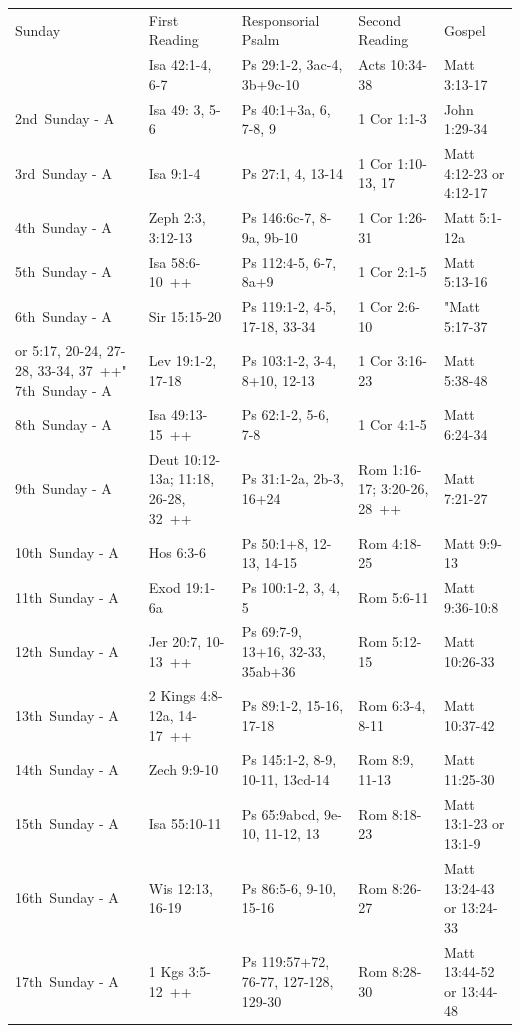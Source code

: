 \documentclass{book}
\begin{document}
\begin{tabular}{l l l l l}
Sunday   &  First Reading  &  Responsorial Psalm  &  Second Reading  &  Gospel\\
[1st Sunday: Baptism of the Lord - A]  &  Isa 42:1-4, 6-7  &  Ps 29:1-2, 3ac-4, 3b+9c-10  &  Acts 10:34-38  &  Matt 3:13-17\\
2nd Sunday - A  &  Isa 49: 3, 5-6  &  Ps 40:1+3a, 6, 7-8, 9  &  1 Cor 1:1-3  &  John 1:29-34\\
3rd Sunday - A  &  Isa 9:1-4  &  Ps 27:1, 4, 13-14  &  1 Cor 1:10-13, 17  &  Matt 4:12-23 or 4:12-17\\
4th Sunday - A  &  Zeph 2:3, 3:12-13  &  Ps 146:6c-7, 8-9a, 9b-10  &  1 Cor 1:26-31  &  Matt 5:1-12a\\
5th Sunday - A  &  Isa 58:6-10 ++  &  Ps 112:4-5, 6-7, 8a+9  &  1 Cor 2:1-5  &  Matt 5:13-16\\
6th Sunday - A  &  Sir 15:15-20  &  Ps 119:1-2, 4-5, 17-18, 33-34  &  1 Cor 2:6-10  &  "Matt 5:17-37 \\
or 5:17, 20-24, 27-28, 33-34, 37 ++"
7th Sunday - A  &  Lev 19:1-2, 17-18  &  Ps 103:1-2, 3-4, 8+10, 12-13  &  1 Cor 3:16-23  &  Matt 5:38-48\\
8th Sunday - A  &  Isa 49:13-15 ++  &  Ps 62:1-2, 5-6, 7-8  &  1 Cor 4:1-5  &  Matt 6:24-34\\
9th Sunday - A  &  Deut 10:12-13a; 11:18, 26-28, 32 ++  &  Ps 31:1-2a, 2b-3, 16+24  &  Rom 1:16-17; 3:20-26, 28 ++  &  Matt 7:21-27\\
10th Sunday - A  &  Hos 6:3-6  &  Ps 50:1+8, 12-13, 14-15  &  Rom 4:18-25  &  Matt 9:9-13\\
11th Sunday - A  &  Exod 19:1-6a  &  Ps 100:1-2, 3, 4, 5  &  Rom 5:6-11  &  Matt 9:36-10:8\\
12th Sunday - A  &  Jer 20:7, 10-13 ++  &  Ps 69:7-9, 13+16, 32-33, 35ab+36  &  Rom 5:12-15  &  Matt 10:26-33\\
13th Sunday - A  &  2 Kings 4:8-12a, 14-17 ++  &  Ps 89:1-2, 15-16, 17-18  &  Rom 6:3-4, 8-11  &  Matt 10:37-42\\
14th Sunday - A  &  Zech 9:9-10  &  Ps 145:1-2, 8-9, 10-11, 13cd-14  &  Rom 8:9, 11-13  &  Matt 11:25-30\\
15th Sunday - A  &  Isa 55:10-11  &  Ps 65:9abcd, 9e-10, 11-12, 13  &  Rom 8:18-23  &  Matt 13:1-23 or 13:1-9\\
16th Sunday - A  &  Wis 12:13, 16-19  &  Ps 86:5-6, 9-10, 15-16  &  Rom 8:26-27  &  Matt 13:24-43 or 13:24-33\\
17th Sunday - A  &  1 Kgs 3:5-12 ++  &  Ps 119:57+72, 76-77, 127-128, 129-30  &  Rom 8:28-30  &  Matt 13:44-52 or 13:44-48\\

\end{tabular}
\end{document}
